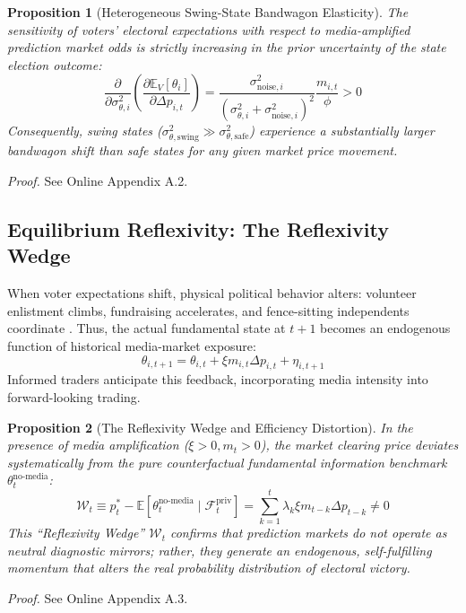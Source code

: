 \documentclass[12pt, a4paper]{article}
\newtheorem{proposition}{Proposition}
\begin{document}
\begin{proposition}[Heterogeneous Swing-State Bandwagon Elasticity]
\label{prop:swing}
The sensitivity of voters' electoral expectations with respect to media-amplified prediction market odds is strictly increasing in the prior uncertainty of the state election outcome:
\begin{equation}
\frac{\partial}{\partial \sigma_{\theta, i}^2} \left( \frac{\partial \mathbb{E}_V[\theta_i]}{\partial \Delta p_{i,t}} \right) = \frac{\sigma_{\text{noise}, i}^2}{(\sigma_{\theta, i}^2 + \sigma_{\text{noise}, i}^2)^2} \frac{m_{i,t}}{\phi} > 0
\end{equation}
Consequently, swing states ($\sigma_{\theta, \text{swing}}^2 \gg \sigma_{\theta, \text{safe}}^2$) experience a substantially larger bandwagon shift than safe states for any given market price movement.
\end{proposition}
\noindent \textit{Proof.} See Online Appendix A.2.

\subsection{Equilibrium Reflexivity: The Reflexivity Wedge}
When voter expectations shift, physical political behavior alters: volunteer enlistment climbs, fundraising accelerates, and fence-sitting independents coordinate \citep{DellaVignaKaplan2007}. Thus, the actual fundamental state at $t+1$ becomes an endogenous function of historical media-market exposure:
\begin{equation}
\theta_{i, t+1} = \theta_{i, t} + \xi m_{i, t} \Delta p_{i, t} + \eta_{i, t+1}
\end{equation}
Informed traders anticipate this feedback, incorporating media intensity into forward-looking trading.

\begin{proposition}[The Reflexivity Wedge and Efficiency Distortion]
\label{prop:wedge}
In the presence of media amplification ($\xi > 0, m_t > 0$), the market clearing price deviates systematically from the pure counterfactual fundamental information benchmark $\theta_t^{\text{no-media}}$:
\begin{equation}
\mathcal{W}_t \equiv p_t^* - \mathbb{E}[\theta_t^{\text{no-media}} \mid \mathcal{F}_t^{\text{priv}}] = \sum_{k=1}^t \lambda_k \xi m_{t-k} \Delta p_{t-k} \neq 0
\end{equation}
This ``Reflexivity Wedge'' $\mathcal{W}_t$ confirms that prediction markets do not operate as neutral diagnostic mirrors; rather, they generate an endogenous, self-fulfilling momentum that alters the real probability distribution of electoral victory.
\end{proposition}
\noindent \textit{Proof.} See Online Appendix A.3.
\end{document}
